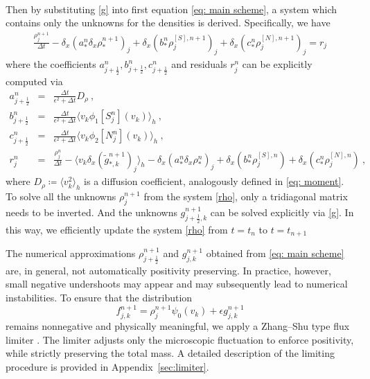 \documentclass[11pt,twoside]{article}
\theoremstyle{nonumberplain}
\newcommand{\GER}{\color{myblue}}
\begin{document}
{\begin{align}
\end{align}
Then by substituting \eqref{g} into first equation \eqref{eq: main scheme}, a system which contains only the unknowns for the densities is derived. Specifically, we have  
\begin{eqnarray}\label{rho}
  \frac{\rho_j^{n+1}}{\Delta t}-\delta_x(a_*^n\delta_x\rho_*^{n+1})_j  +\delta_x(b_*^n\rho^{[S],n+1}_{j})_j 
  +\delta_x(c_*^n\rho^{[N],n+1}_{j})_j
  =r_j 
\end{eqnarray}
where the coefficients $a_{j+\frac{1}{2}}^n, b_{j+\frac{1}{2}}^n, c_{j+\frac{1}{2}}^n$ and residuals $r_j^n$ can be explicitly computed via
\begin{eqnarray*}
    a_{j+\frac{1}{2}}^n&=&\frac{\Delta t}{\epsilon^2+\Delta t} D_\rho\ ,\nonumber\\
    b_{j+\frac{1}{2}}^n&=&\frac{\Delta t}{\epsilon^2+\Delta t} \langle v_k\phi_1[S_{j}^n](v_k)\rangle_h\ ,\nonumber\\
    c_{j+\frac{1}{2}}^n&=&\frac{\Delta t}{\epsilon^2+\Delta t} \langle v_k\phi_2[N_{j}^n](v_k)\rangle_h\ ,\nonumber\\
    r_j^n&=&\frac{{\rho_j^{n}}}{\Delta t}-\langle v_k\delta_x(\tilde{g}_{*,k}^{n+1})_j\rangle_h
    -\delta_x(a_*^n\delta_x\rho_*^n)_j
    +\delta_x(b_*^n\rho^{[S],n}_{j})
    +\delta_x(c_*^n\rho^{[N],n}_{j})\ ,
    \end{eqnarray*}
    where $D_\rho\coloneqq\langle v_k^2\rangle_h$ is a diffusion coefficient, analogously defined in \eqref{eq: moment}. 
To solve all the unknowns $\rho_j^{n+1}$ from the system \eqref{rho}, only a tridiagonal matrix needs to be inverted. And the unknowns 
 $g_{j+\frac{1}{2},k}^{n+1}$ can be solved explicitly via \eqref{g}. In this way, we efficiently update the system \eqref{rho} from $t=t_n$ to $t=t_{n+1}$}


{
The numerical approximations $\rho_{j+\frac12}^{n+1}$ and $g_{j,k}^{n+1}$ obtained from \eqref{eq: main scheme} are, in general, not automatically positivity preserving.
In practice, however, small negative undershoots may appear and may subsequently lead to numerical instabilities.
To ensure that the distribution
$$
f_{j,k}^{n+1} = \rho_j^{n+1} \psi_0(v_k) + \epsilon g_{j,k}^{n+1}
$$
remains nonnegative and physically meaningful, we apply a {\GER Zhang–Shu type flux limiter \cite{ZS-limiter,ZS-limiter1}}.
The limiter adjusts only the microscopic fluctuation to enforce positivity, while strictly preserving the total mass. 
A detailed description of the limiting procedure is provided in Appendix~\ref{sec:limiter}.
}
\end{document}

